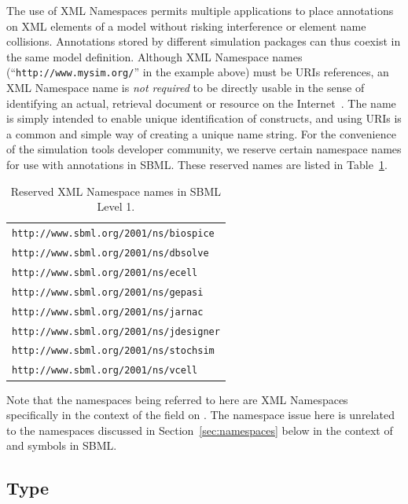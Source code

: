 \documentclass[10pt]{cekarticle}
\newcommand{\vref}[1]{\ref{#1}}
\begin{document}
The use of XML Namespaces permits multiple applications to place
annotations on XML elements of a model without risking interference or
element name collisions.  Annotations stored by different simulation
packages can thus coexist in the same model definition.  Although XML
Namespace names (``\texttt{http://www.mysim.org/}'' in the example above)
must be URIs references, an XML Namespace name is \emph{not required} to be
directly usable in the sense of identifying an actual, retrieval document
or resource on the Internet~\citep{bray:1999}.  The name is simply intended
to enable unique identification of constructs, and using URIs is a common
and simple way of creating a unique name string.  For the convenience of
the simulation tools developer community, we reserve certain namespace
names for use with annotations in SBML.  These reserved names are listed in
Table~\vref{tab:reserved-urls}.

\begin{table}[b]
  \vspace*{5pt}
  \centering
  \begin{tabular}{l}
    \toprule
    \texttt{http://www.sbml.org/2001/ns/biospice}\\
    \texttt{http://www.sbml.org/2001/ns/dbsolve}\\
    \texttt{http://www.sbml.org/2001/ns/ecell}\\
    \texttt{http://www.sbml.org/2001/ns/gepasi}\\
    \texttt{http://www.sbml.org/2001/ns/jarnac}\\
    \texttt{http://www.sbml.org/2001/ns/jdesigner}\\
    \texttt{http://www.sbml.org/2001/ns/stochsim}\\
    \texttt{http://www.sbml.org/2001/ns/vcell}\\
    \bottomrule
  \end{tabular}
  \caption{Reserved XML Namespace names in SBML Level 1.}
  \label{tab:reserved-urls}
\end{table}

Note that the namespaces being referred to here are XML Namespaces
specifically in the context of the  field on
.  The namespace issue here is unrelated to the namespaces
discussed in Section~\ref{sec:namespaces} below in the context of
 and symbols in SBML.


\subsection{Type }
\label{sec:name}
\end{document}
